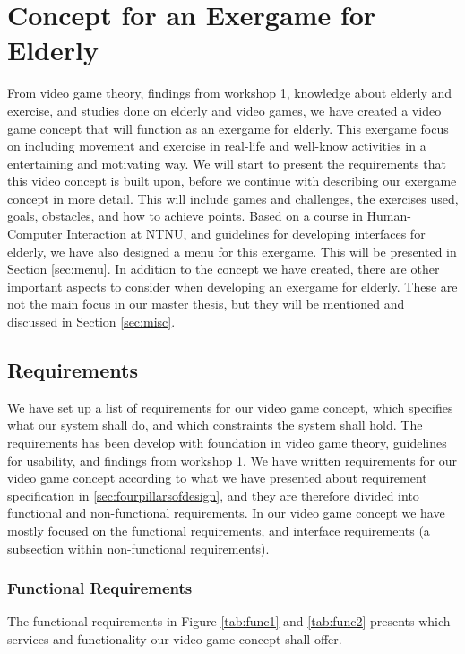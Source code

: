 \chapter{Concept for an Exergame for Elderly}
From video game theory, findings from workshop 1, knowledge about elderly and exercise, and studies done on elderly and video games, we have created a video game concept that will function as an exergame for elderly. This exergame focus on including movement and exercise in real-life and well-know activities in a entertaining and motivating way. We will start to present the requirements that this video concept is built upon, before we continue with describing our exergame concept in more detail. This will include games and challenges, the exercises used, goals, obstacles, and how to achieve points. Based on a course in Human-Computer Interaction at NTNU, and guidelines for developing interfaces for elderly, we have also designed a menu for this exergame. This will be presented in Section \ref{sec:menu}. In addition to the concept we have created, there are other important aspects to consider when developing an exergame for elderly. These are not the main focus in our master thesis, but they will be mentioned and discussed in Section \ref{sec:misc}.

\section{Requirements}
\label{sec:req}
We have set up a list of requirements for our video game concept, which specifies what our system shall do, and which constraints the system shall hold. The requirements has been develop with foundation in video game theory, guidelines for usability, and findings from workshop 1. We have written requirements for our video game concept according to what we have presented about requirement specification in \ref{sec:fourpillarsofdesign}, and they are therefore divided into functional and non-functional requirements. In our video game concept we have mostly focused on the functional requirements, and interface requirements (a subsection within non-functional requirements). 

\subsection{Functional Requirements}
The functional requirements in Figure \ref{tab:func1} and \ref{tab:func2} presents which services and functionality our video game concept shall offer.


